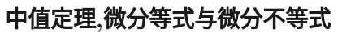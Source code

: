 \documentclass[8pt a4paper, oneside, UTF8]{ctexbook}  %
\begin{document}
\begin{sloppypar}
    \else
    \fi
    \chapter{中值定理,微分等式与微分不等式}
    
    \ifx\allfiles\undefined
\end{sloppypar}
\end{document}
